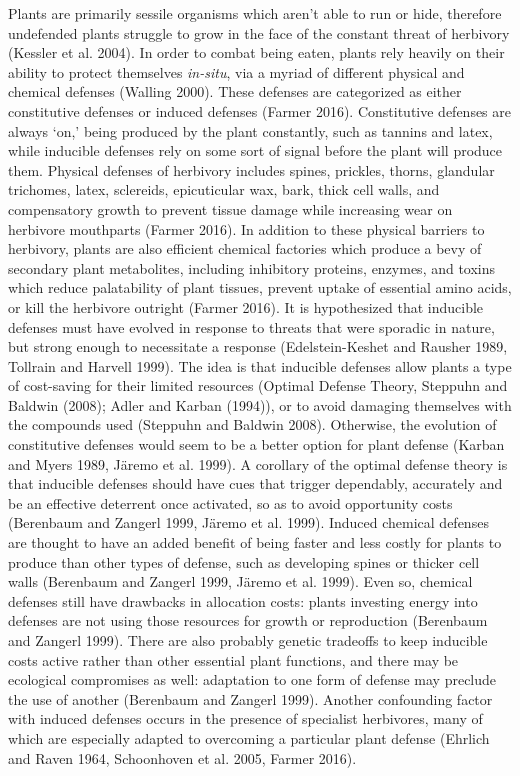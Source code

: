 \documentclass[12pt,final,CPage]{ufthesis}
\begin{document}
{  Plants are primarily sessile organisms which aren't able to run or hide, therefore undefended plants struggle to grow in the face of the constant threat of herbivory (Kessler et al. 2004). In order to combat being eaten, plants rely heavily on their ability to protect themselves \emph{in-situ}, via a myriad of different physical and chemical defenses (Walling 2000). These defenses are categorized as either constitutive defenses or induced defenses (Farmer 2016). Constitutive defenses are always `on,' being produced by the plant constantly, such as tannins and latex, while inducible defenses rely on some sort of signal before the plant will produce them. Physical defenses of herbivory includes spines, prickles, thorns, glandular trichomes, latex, sclereids, epicuticular wax, bark, thick cell walls, and compensatory growth to prevent tissue damage while increasing wear on herbivore mouthparts (Farmer 2016). In addition to these physical barriers to herbivory, plants are also efficient chemical factories which produce a bevy of secondary plant metabolites, including inhibitory proteins, enzymes, and toxins which reduce palatability of plant tissues, prevent uptake of essential amino acids, or kill the herbivore outright (Farmer 2016). It is hypothesized that inducible defenses must have evolved in response to threats that were sporadic in nature, but strong enough to necessitate a response (Edelstein-Keshet and Rausher 1989, Tollrain and Harvell 1999). The idea is that inducible defenses allow plants a type of cost-saving for their limited resources (Optimal Defense Theory, Steppuhn and Baldwin (2008); Adler and Karban (1994)), or to avoid damaging themselves with the compounds used (Steppuhn and Baldwin 2008). Otherwise, the evolution of constitutive defenses would seem to be a better option for plant defense (Karban and Myers 1989, Järemo et al. 1999). A corollary of the optimal defense theory is that inducible defenses should have cues that trigger dependably, accurately and be an effective deterrent once activated, so as to avoid opportunity costs (Berenbaum and Zangerl 1999, Järemo et al. 1999). Induced chemical defenses are thought to have an added benefit of being faster and less costly for plants to produce than other types of defense, such as developing spines or thicker cell walls (Berenbaum and Zangerl 1999, Järemo et al. 1999). Even so, chemical defenses still have drawbacks in allocation costs: plants investing energy into defenses are not using those resources for growth or reproduction (Berenbaum and Zangerl 1999). There are also probably genetic tradeoffs to keep inducible costs active rather than other essential plant functions, and there may be ecological compromises as well: adaptation to one form of defense may preclude the use of another (Berenbaum and Zangerl 1999). Another confounding factor with induced defenses occurs in the presence of specialist herbivores, many of which are especially adapted to overcoming a particular plant defense (Ehrlich and Raven 1964, Schoonhoven et al. 2005, Farmer 2016).

}
\end{document}
